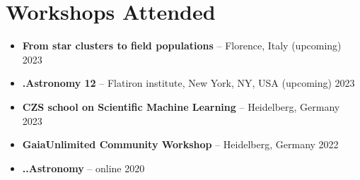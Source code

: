 \section*{Workshops Attended}

\begin{itemize}
    \item \textbf{From star clusters to field populations} -- Florence, Italy \hfill (upcoming) 2023
    \item \textbf{.Astronomy 12} -- Flatiron institute, New York, NY, USA \hfill (upcoming) 2023
    \item \textbf{CZS school on Scientific Machine Learning} -- Heidelberg, Germany \hfill 2023
    \item \textbf{GaiaUnlimited Community Workshop} -- Heidelberg, Germany \hfill 2022
    \item \textbf{..Astronomy} -- online \hfill 2020
\end{itemize}